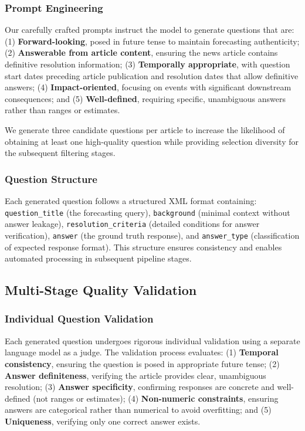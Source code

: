 \subsubsection{Prompt Engineering}
Our carefully crafted prompts instruct the model to generate questions that are: (1) \textbf{Forward-looking}, posed in future tense to maintain forecasting authenticity; (2) \textbf{Answerable from article content}, ensuring the news article contains definitive resolution information; (3) \textbf{Temporally appropriate}, with question start dates preceding article publication and resolution dates that allow definitive answers; (4) \textbf{Impact-oriented}, focusing on events with significant downstream consequences; and (5) \textbf{Well-defined}, requiring specific, unambiguous answers rather than ranges or estimates.

We generate three candidate questions per article to increase the likelihood of obtaining at least one high-quality question while providing selection diversity for the subsequent filtering stages.

\subsubsection{Question Structure}
Each generated question follows a structured XML format containing: \texttt{question\_title} (the forecasting query), \texttt{background} (minimal context without answer leakage), \texttt{resolution\_criteria} (detailed conditions for answer verification), \texttt{answer} (the ground truth response), and \texttt{answer\_type} (classification of expected response format). This structure ensures consistency and enables automated processing in subsequent pipeline stages.

\subsection{Multi-Stage Quality Validation}
\label{subsec:quality_validation}

\subsubsection{Individual Question Validation}
Each generated question undergoes rigorous individual validation using a separate language model as a judge. The validation process evaluates: (1) \textbf{Temporal consistency}, ensuring the question is posed in appropriate future tense; (2) \textbf{Answer definiteness}, verifying the article provides clear, unambiguous resolution; (3) \textbf{Answer specificity}, confirming responses are concrete and well-defined (not ranges or estimates); (4) \textbf{Non-numeric constraints}, ensuring answers are categorical rather than numerical to avoid overfitting; and (5) \textbf{Uniqueness}, verifying only one correct answer exists.

